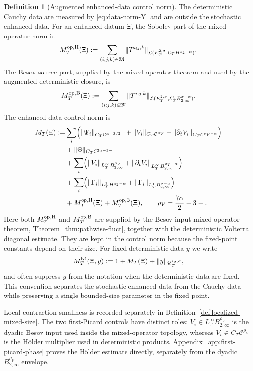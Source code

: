 \documentclass[10pt]{amsart}
\numberwithin{equation}{section}
\theoremstyle{plain}
\theoremstyle{definition}
\newtheorem{definition}[theorem]{Definition}
\theoremstyle{remark}
\newcommand{\C}{\mathcal{C}}
\newcommand{\Btwo}{B_{2,\infty}}
\begin{document}
\begin{definition}[Augmented enhanced-data control norm]\label{def:enhanced-data-norm}
The deterministic Cauchy data are measured by \eqref{eq:data-norm-Y} and are outside the stochastic enhanced data.  For an enhanced datum $\Xi$, the Sobolev part of the mixed-operator norm is
\begin{equation}\label{eq:MJopH}
M_T^{\rm op,H}(\Xi):=
\sum_{(i;j,k)\in\mathfrak M}
\|T^{i;j,k}\|_{\mathcal L(E_T^{2,\sigma},C_TH^{s_2-\alpha})}.
\end{equation}
The Besov source part, supplied by the mixed-operator theorem and used by the augmented deterministic closure, is
\begin{equation}\label{eq:MJopB}
M_T^{\rm op,B}(\Xi):=
\sum_{(i;j,k)\in\mathfrak M}
\|T^{i;j,k}\|_{\mathcal L(E_T^{2,\sigma},L_T^1\Btwo^{\sigma-\alpha})}.
\end{equation}
The enhanced-data control norm is
\begin{align}\label{eq:MJ}
M_T(\Xi):=&\sum_i\Bigl(
\|\Psi_i\|_{C_T\C^{\alpha-3/2-}}
+\|V_i\|_{C_T\C^{\rho_V}}
+\|\partial_tV_i\|_{C_T\C^{\rho_V-\alpha}}
\Bigr)\nonumber\\
&+\|\Theta\|_{C_T\C^{2\alpha-3-}}\nonumber\\
&+\sum_i\Bigl(
\|V_i\|_{L_T^\infty\Btwo^{\rho_V}}
+\|\partial_tV_i\|_{L_T^\infty\Btwo^{\rho_V-\alpha}}
\Bigr)\nonumber\\
&+\sum_i\Bigl(
\|\Gamma_i\|_{L_T^1H^{s_2-\alpha}}
+\|\Gamma_i\|_{L_T^1\Btwo^{\sigma-\alpha}}
\Bigr)\nonumber\\
&+M_T^{\rm op,H}(\Xi)+M_T^{\rm op,B}(\Xi),\qquad
\rho_V=\frac{7\alpha}{2}-3-.
\end{align}
Here both $M_T^{\rm op,H}$ and $M_T^{\rm op,B}$ are supplied by the Besov-input mixed-operator theorem, Theorem~\ref{thm:pathwise-fluct}, together with the deterministic Volterra diagonal estimate.  They are kept in the control norm because the fixed-point constants depend on their size.  For fixed deterministic data $y$ we write
\begin{equation}\label{eq:bounded-size}
        M_T^{\rm bd}(\Xi,y):=1+M_T(\Xi)+\|y\|_{\mathcal H_T^{s_2,\sigma}},
\end{equation}
and often suppress $y$ from the notation when the deterministic data are fixed.  This convention separates the stochastic enhanced data from the Cauchy data while preserving a single bounded-size parameter in the fixed point.

Local contraction smallness is recorded separately in Definition~\ref{def:localized-mixed-size}.  The two first-Picard controls have distinct roles: $V_i\in L_T^\infty\Btwo^{\rho_V}$ is the dyadic Besov input used inside the mixed-operator topology, whereas $V_i\in C_T\C^{\rho_V}$ is the H\"older multiplier used in deterministic products.  Appendix~\ref{app:first-picard-phase} proves the H\"older estimate directly, separately from the dyadic $B_{2,\infty}^{\rho_V}$ envelope.
\end{definition}
\end{document}
